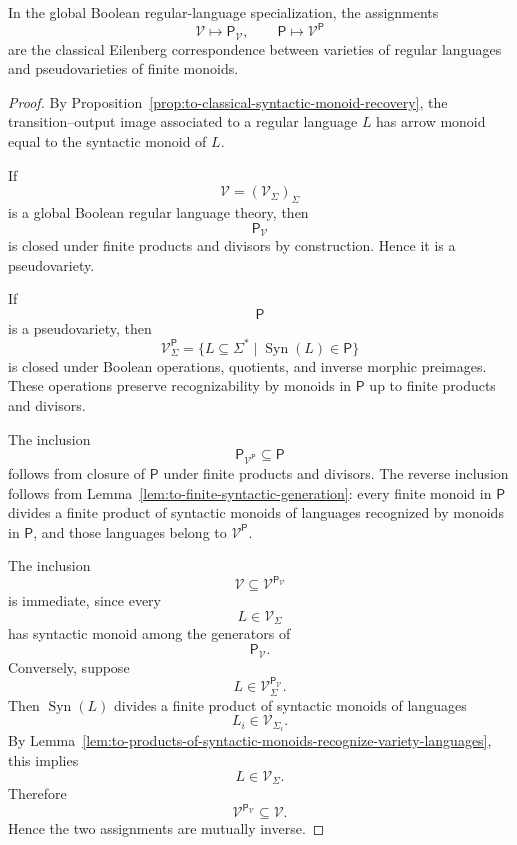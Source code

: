 \begin{theorem}
\label{thm:to-classical-eilenberg-recovery}
    In the global Boolean regular-language specialization, the assignments
    \[
        \mathcal V\longmapsto \mathsf P_{\mathcal V},
        \qquad
        \mathsf P\longmapsto \mathcal V^{\mathsf P}
    \]
    are the classical Eilenberg correspondence between varieties of regular
    languages and pseudovarieties of finite monoids.
\end{theorem}

\begin{proof}
    By Proposition~\ref{prop:to-classical-syntactic-monoid-recovery}, the
    transition--output image associated to a regular language \(L\) has arrow
    monoid equal to the syntactic monoid of \(L\).

    If
    \[
        \mathcal V=(\mathcal V_\Sigma)_\Sigma
    \]
    is a global Boolean regular language theory, then
    \[
        \mathsf P_{\mathcal V}
    \]
    is closed under finite products and divisors by construction. Hence it is a
    pseudovariety.

    If
    \[
        \mathsf P
    \]
    is a pseudovariety, then
    \[
        \mathcal V^{\mathsf P}_\Sigma
        =
        \{L\subseteq\Sigma^*
          \mid
          \operatorname{Syn}(L)\in\mathsf P\}
    \]
    is closed under Boolean operations, quotients, and inverse morphic
    preimages. These operations preserve recognizability by monoids in
    \(\mathsf P\) up to finite products and divisors.

    The inclusion
    \[
        \mathsf P_{\mathcal V^{\mathsf P}}\subseteq\mathsf P
    \]
    follows from closure of \(\mathsf P\) under finite products and divisors.
    The reverse inclusion follows from
    Lemma~\ref{lem:to-finite-syntactic-generation}: every finite monoid in
    \(\mathsf P\) divides a finite product of syntactic monoids of languages
    recognized by monoids in \(\mathsf P\), and those languages belong to
    \(\mathcal V^{\mathsf P}\).

    The inclusion
    \[
        \mathcal V\subseteq\mathcal V^{\mathsf P_{\mathcal V}}
    \]
    is immediate, since every
    \[
        L\in\mathcal V_\Sigma
    \]
    has syntactic monoid among the generators of
    \[
        \mathsf P_{\mathcal V}.
    \]
    Conversely, suppose
    \[
        L\in \mathcal V^{\mathsf P_{\mathcal V}}_\Sigma.
    \]
    Then \(\operatorname{Syn}(L)\) divides a finite product of syntactic
    monoids of languages
    \[
        L_i\in\mathcal V_{\Sigma_i}.
    \]
    By
    Lemma~\ref{lem:to-products-of-syntactic-monoids-recognize-variety-languages},
    this implies
    \[
        L\in\mathcal V_\Sigma.
    \]
    Therefore
    \[
        \mathcal V^{\mathsf P_{\mathcal V}}\subseteq\mathcal V.
    \]
    Hence the two assignments are mutually inverse.
\end{proof}

